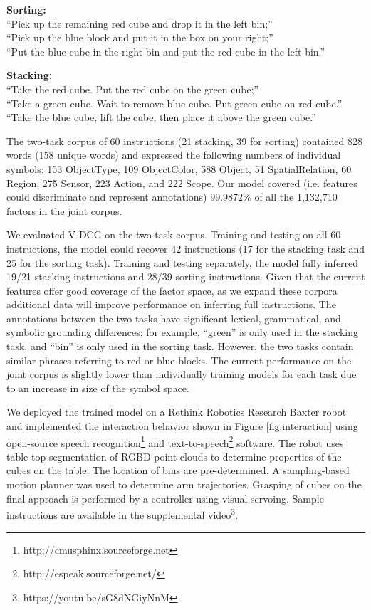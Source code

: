 \documentclass[letterpaper]{article} %
\begin{document}
\textbf{Sorting:}\\
``Pick up the remaining red cube and drop it in the left bin;''\\
``Pick up the blue block and put it in the box on your right;''\\
``Put the blue cube in the right bin and put the red cube in the left bin.''

\textbf{Stacking:}\\
``Take the red cube. Put the red cube on the green cube;''\\
``Take a green cube. Wait to remove blue cube. Put green cube on red cube.''\\
``Take the blue cube, lift the cube, then place it above the green cube.''

The two-task corpus of 60 instructions (21 stacking, 39 for sorting) contained 828 words (158 unique words) and expressed the following numbers of individual symbols: 153 ObjectType, 109 ObjectColor, 588 Object, 51 SpatialRelation, 60 Region, 275 Sensor, 223 Action, and 222 Scope.
Our model covered (i.e. features could discriminate and represent annotations) 99.9872\% of all the 1,132,710 factors in the joint corpus. 

We evaluated V-DCG on the two-task corpus. Training and testing on all 60 instructions, the model could recover 42 instructions (17 for the stacking task and 25 for the sorting task). Training and testing separately, the model fully inferred 19/21 stacking instructions and 28/39 sorting instructions. Given that the current features offer good coverage of the factor space, as we expand these corpora additional data will improve performance on inferring full instructions.
The annotations between the two tasks have significant lexical, grammatical, and symbolic grounding differences; for example, ``green'' is only used in the stacking task, and ``bin'' is only used in the sorting task. However, the two tasks contain similar phrases referring to red or blue blocks.
The current performance on the joint corpus is slightly lower than individually training models for each task due to an increase in size of the symbol space.

We deployed the trained model on a Rethink Robotics Research Baxter robot and implemented the interaction behavior shown in Figure \ref{fig:interaction} using open-source speech recognition\footnote{http://cmusphinx.sourceforge.net} and text-to-speech\footnote{http://espeak.sourceforge.net/} software.
The robot uses table-top segmentation of RGBD point-clouds to determine properties of the cubes on the table. The location of bins are pre-determined. 
A sampling-based motion planner was used to determine arm trajectories. Grasping of cubes on the final approach is performed by a controller using visual-servoing. Sample instructions are available in the supplemental video\footnote{https://youtu.be/sG8dNGiyNnM}.
\end{document}
